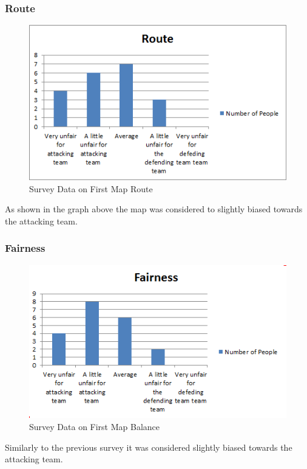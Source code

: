 \documentclass[12pt,a4paper,oneside]{book}
\begin{document}
\subsubsection{Route}
\begin{figure}[H]
	\includegraphics[width=1.0\textwidth]{images/Route1.png}
	\caption{Survey Data on First Map Route}
\end{figure}
As shown in the graph above the map was considered to slightly biased towards the attacking team.
\subsubsection{Fairness}
\begin{figure}[H]
	\includegraphics[width=1.0\textwidth]{images/Fair1.png}
	\caption{Survey Data on First Map Balance}
\end{figure}
Similarly to the previous survey it was considered slightly biased towards the attacking team.
\end{document}
